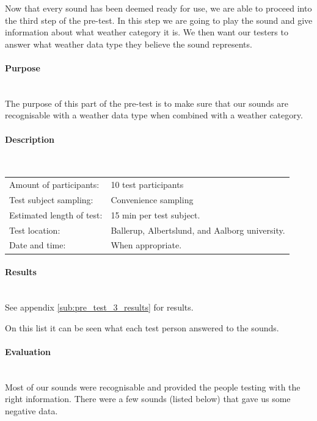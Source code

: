 Now that every sound has been deemed ready for use, we are able to proceed into the third step of the pre-test. 
In this step we are going to play the sound and give information about what weather category it is. 
We then want our testers to answer what weather data type they believe the sound represents.  

\paragraph{Purpose} %
\label{par:pre_test_3_purpose}
\hspace{0pt} \\
The purpose of this part of the pre-test is to make sure that our sounds are recognisable with a weather data type when combined with a weather category.

\paragraph{Description} %
\label{par:pre_test_3_description}
\hspace{0pt} \\
\begin{tabular}{l l}
Amount of participants: & 10 test participants \\
Test subject sampling: & Convenience sampling \\
Estimated length of test: & 15 min per test subject. \\
Test location: & Ballerup, Albertslund, and Aalborg university. \\
Date and time: & When appropriate.
\end{tabular}

\paragraph{Results} %
\label{par:pre_test_3_results}
\hspace{0pt} \\
See appendix \ref{sub:pre_test_3_results} for results.

On this list it can be seen what each test person answered to the sounds.

\paragraph{Evaluation} %
\label{par:pre_test_3_evaluation}
\hspace{0pt} \\
Most of our sounds were recognisable and provided the people testing with the right information. \newline
There were a few sounds (listed below) that gave us some negative data.

